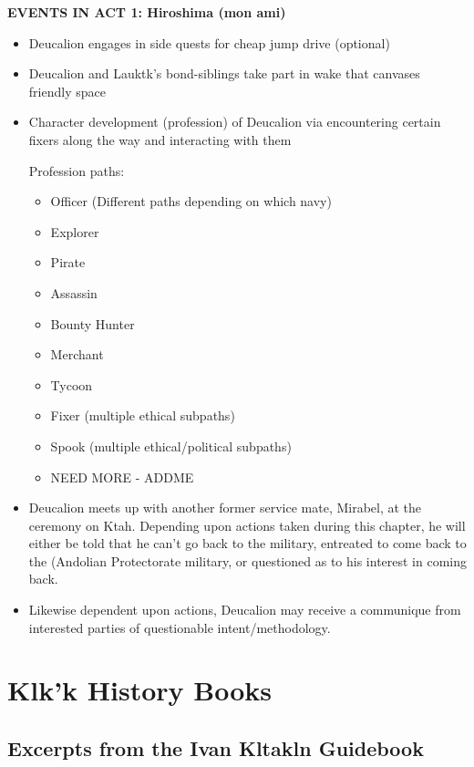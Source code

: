 {\bf EVENTS IN ACT 1: Hiroshima (mon ami)}
\begin{itemize}
\item Deucalion engages in side quests for cheap jump drive (optional)
\item Deucalion and Lauktk's bond-siblings take part in wake that canvases friendly space
\item Character development (profession) of Deucalion via encountering certain fixers along the way and interacting with them

 Profession paths:
\begin{itemize}
\item		Officer (Different paths depending on which navy)
\item		Explorer
\item		Pirate
\item		Assassin
\item		Bounty Hunter
\item		Merchant
\item		Tycoon
\item		Fixer (multiple ethical subpaths)
\item		Spook (multiple ethical/political subpaths)
\item		{NEED MORE - ADDME}
\end{itemize}
\item Deucalion meets up with another former service mate, Mirabel, at
the ceremony on Ktah.  Depending upon actions taken during this
chapter, he will either be told that he can't go back to the military,
entreated to come back to the (Andolian Protectorate military, or
questioned as to his interest in coming back.
\item Likewise dependent upon actions, Deucalion may receive a
communique from interested parties of questionable intent/methodology.
\end{itemize}



\section{Klk'k History Books}

\subsection{Excerpts from the Ivan Kltakln Guidebook}

